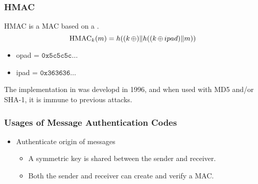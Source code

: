 \subsubsection{HMAC}\label{subsubsec:HMAC}
HMAC is a MAC based on a .
\begin{equation}\label{eq:HMAC}
  \text{HMAC}_{k}(m) = h((k \operatorname{\oplus}) \Vert h((k \operatorname{\oplus} ipad) \Vert m))
\end{equation}
\begin{itemize}[noitemsep]
\item opad = $\mathtt{0x5c5c5c} \ldots$
\item ipad = $\mathtt{0x363636} \ldots$
\end{itemize}

The implementation in  was developd in 1996, and when used with MD5 and/or SHA-1, it is immune to previous attacks.

\subsubsection{Usages of Message Authentication Codes}\label{subsubsec:MAC_Usages}
\begin{itemize}[noitemsep]
\item Authenticate origin of messages
  \begin{itemize}[noitemsep]
  \item A symmetric key is shared between the sender and receiver.
  \item Both the sender and receiver can create and verify a MAC.
  \end{itemize}
\end{itemize}

